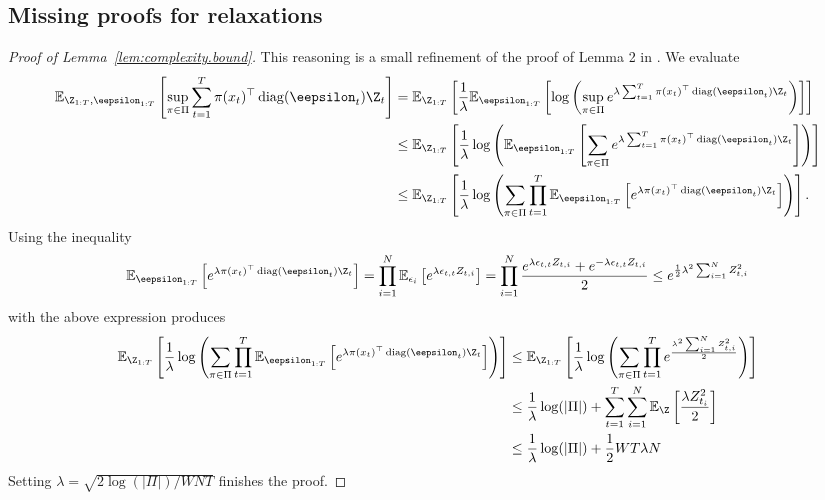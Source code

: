 \documentclass[11pt]{article}
\begin{document}
\subsection{Missing proofs for relaxations}
\begin{proof}[Proof of Lemma~\ref{lem:complexity.bound}]
  This reasoning is a small refinement of the proof of Lemma 2 in \cite{syrgkanis2016improved}. We evaluate
  \begin{align*}
        \ex_{\Z_{1:T},\eepsilon_{1:T}}\left[\sup_{\pi\in\Pi} \sum_{t=1}^T \pi(x_t)^\top \diag( \eepsilon_t) \Z_t \right]
    &=
      \ex_{\Z_{1:T}}\left[\frac{1}{\lambda}
      \ex_{\eepsilon_{1:T}}\left[
      \log\left(
      \sup_{\pi\in\Pi}e^{\lambda \sum_{t=1}^T \pi(x_t)^\top \diag(\eepsilon_t) \Z_t}\right)\right]
      \right]\\
    &\leq
      \ex_{\Z_{1:T}}\left[\frac{1}{\lambda}
      \log\left(
      \ex_{\eepsilon_{1:T}}\left[
      \sum_{\pi\in\Pi}e^{\lambda \sum_{t=1}^T \pi(x_t)^\top \diag(\eepsilon_t) \Z_t}\right]\right)
      \right]\\
    &\leq
      \ex_{\Z_{1:T}}\left[\frac{1}{\lambda}
      \log\left(\sum_{\pi\in\Pi}\prod_{t=1}^T
      \ex_{\eepsilon_{1:T}}\left[
      e^{\lambda \pi(x_t)^\top \diag(\eepsilon_t) \Z_t}\right]\right)
      \right].
  \end{align*}
Using the inequality
  \[
    \ex_{\eepsilon_{1:T}}\left[ e^{\lambda \pi(x_t)^\top \diag(\eepsilon_t) \Z_t}\right]
    =
    \prod_{i=1}^N
    \ex_{\epsilon_i}\left[
      e^{\lambda \epsilon_{t,t} Z_{t,i}}
    \right]
    =
    \prod_{i=1}^N
    \frac{
      e^{\lambda\epsilon_{t,t} Z_{t,i}}
      +
      e^{-\lambda \epsilon_{t,t} Z_{t,i}}
    }{2}
    \leq
    e^{\frac{1}{2}\lambda^2 \sum_{i=1}^N Z_{t,i}^2}
  \]
with the above expression produces
  \begin{align*}
    \ex_{\Z_{1:T}}\left[\frac{1}{\lambda}
    \log\left(\sum_{\pi\in\Pi}\prod_{t=1}^T
    \ex_{\eepsilon_{1:T}}\left[
    e^{\lambda \pi(x_t)^\top \diag(\eepsilon_t) \Z_t}\right]\right)
    \right]
    &\leq
      \ex_{\Z_{1:T}}\left[\frac{1}{\lambda}
      \log\left(\sum_{\pi\in\Pi}\prod_{t=1}^T
      e^{\frac{\lambda^2 \sum_{i=1}^N Z_{t,i}^2 }{2}}
      \right)
      \right]\\
    &\leq
      \frac{1}{\lambda}\log(\vert \Pi\vert)
      + 
      \sum_{t=1}^T \sum_{i=1}^N \ex_{\Z}\left[
      \frac{\lambda Z_{t_i}^2 }{2}
      \right]\\    
    &\leq
      \frac{1}{\lambda}\log(\vert \Pi\vert)
      +
      \frac{1}{2}W T\lambda N
  \end{align*}
  Setting $\lambda = \sqrt{2\log(\vert \Pi\vert)/W N T}$ finishes the proof.
\end{proof}
\end{document}
